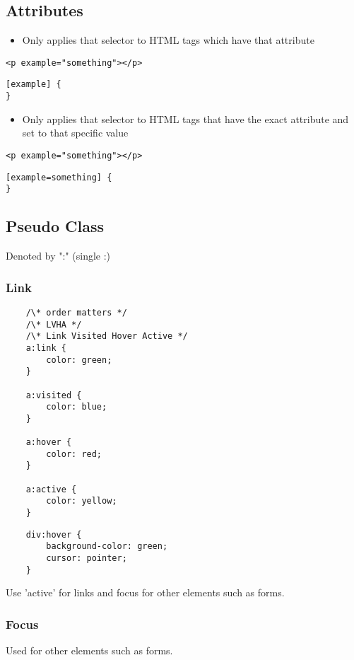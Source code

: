\documentclass[]{article}
\begin{document}
\subsection{Attributes}
\begin{itemize}
	\item Only applies that selector to HTML tags which have that attribute
\end{itemize}
\begin{lstlisting}
<p example="something"></p>
\end{lstlisting}
\begin{lstlisting}
[example] {
}
\end{lstlisting}
\begin{itemize}
	\item Only applies that selector to HTML tags that have the exact attribute and set to that specific value 
\end{itemize}
\begin{lstlisting}
<p example="something"></p>
\end{lstlisting}
\begin{lstlisting}
[example=something] {
}
\end{lstlisting}

\subsection{Pseudo Class}
Denoted by ":" (single :) 
\subsubsection{Link}
\begin{lstlisting}
	/\* order matters */
	/\* LVHA */
	/\* Link Visited Hover Active */
	a:link {
		color: green;
	}
	
	a:visited {
		color: blue;
	}
	
	a:hover {
		color: red;
	}
	
	a:active {
		color: yellow;
	}
\end{lstlisting}

\begin{lstlisting}
	div:hover {
		background-color: green;
		cursor: pointer;
	}
\end{lstlisting}
Use 'active' for links and focus for other elements such as forms.

\subsubsection{Focus}
Used for other elements such as forms.
\end{document}

